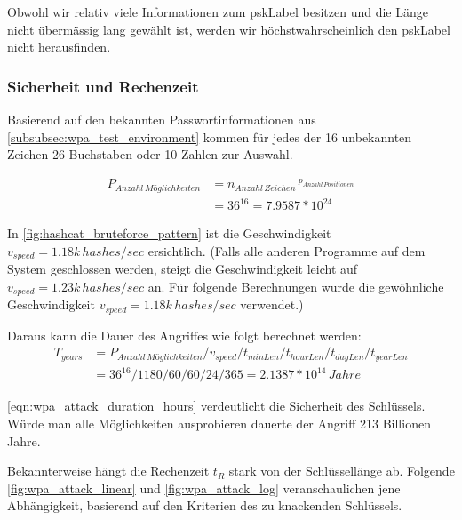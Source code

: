 Obwohl wir relativ viele Informationen zum \gls{pskLabel} besitzen und die Länge nicht übermässig lang gewählt ist, werden wir höchstwahrscheinlich den \gls{pskLabel} nicht herausfinden.


\subsubsection{Sicherheit und Rechenzeit}

Basierend auf den bekannten Passwortinformationen aus \cref{subsubsec:wpa_test_environment} kommen für jedes der 16 unbekannten Zeichen 26 Buchstaben oder 10 Zahlen zur Auswahl.

\begin{equation}
	\begin{split}
	\label{eqn:wpa_attack_key_possibelities}
	P_{Anzahl\,Möglichkeiten} &= n_{Anzahl\,Zeichen}\,^{p_{Anzahl\,Positionen}}\\
	&= 36^{16} = 7.9587 * 10^{24}
	\end{split}
\end{equation}

In \cref{fig:hashcat_bruteforce_pattern} ist die Geschwindigkeit $v_{speed} = 1.18k\,hashes/sec$ ersichtlich.
(Falls alle anderen Programme auf dem System geschlossen werden, steigt die Geschwindigkeit leicht auf $v_{speed} = 1.23k\,hashes/sec$ an.
Für folgende Berechnungen wurde die gewöhnliche Geschwindigkeit $v_{speed} = 1.18k\,hashes/sec$ verwendet.)

Daraus kann die Dauer des Angriffes wie folgt berechnet werden:
\begin{equation}
	\begin{split}
	\label{eqn:wpa_attack_duration_hours}
	T_{years} &= P_{Anzahl\,Möglichkeiten} / v_{speed} / t_{minLen} / t_{hourLen} / t_{dayLen} / t_{yearLen}\\
	&= 36^{16} / 1180 / 60 / 60 / 24 / 365 = 2.1387 * 10^{14}\,Jahre
	\end{split}
\end{equation}

\cref{eqn:wpa_attack_duration_hours} verdeutlicht die Sicherheit des Schlüssels. Würde man alle Möglichkeiten ausprobieren dauerte der Angriff 213 Billionen Jahre.

Bekannterweise hängt die Rechenzeit $t_R$ stark von der Schlüssellänge ab.
Folgende \cref{fig:wpa_attack_linear} und \cref{fig:wpa_attack_log} veranschaulichen jene Abhängigkeit, basierend auf den Kriterien des zu knackenden Schlüssels.

